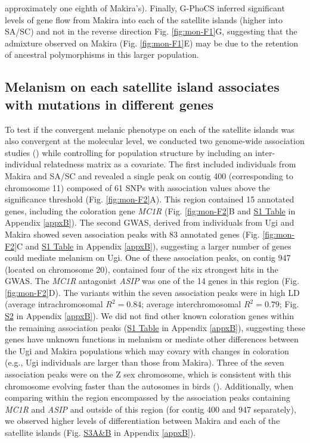 approximately one eighth of Makira’s). Finally, G-PhoCS inferred significant levels of gene flow from Makira into each of the satellite islands (higher into \ac{SA/SC}) and not in the reverse direction Fig. \ref{fig:mon-F1}G, suggesting that the admixture observed on Makira (Fig. \ref{fig:mon-F1}E) may be due to the retention of ancestral polymorphisms in this larger population.

\subsection{Melanism on each satellite island associates with mutations in different genes}
To test if the convergent melanic phenotype on each of the satellite islands was also convergent at the molecular level, we conducted two genome-wide association studies () while controlling for population structure by including an inter-individual relatedness matrix as a covariate. The first included individuals from Makira and \ac{SA/SC} and revealed a single peak on contig 400 (corresponding to chromosome 11) composed of 61 \acsp{SNP} with association values above the significance threshold (Fig. \ref{fig:mon-F2}A). This region contained 15 annotated genes, including the coloration gene \textit{MC1R} (Fig. \ref{fig:mon-F2}B and \href{https://journals.plos.org/PLOSGENETICS/article?id=10.1371/journal.pgen.1010474#sec017}{S1 Table} in Appendix \ref{appxB}). The second \acs{GWAS}, derived from individuals from Ugi and Makira showed seven association peaks with 83 annotated genes (Fig. \ref{fig:mon-F2}C and \href{https://journals.plos.org/PLOSGENETICS/article?id=10.1371/journal.pgen.1010474#sec017}{S1 Table} in Appendix \ref{appxB}), suggesting a larger number of genes could mediate melanism on Ugi. One of these association peaks, on contig 947 (located on chromosome 20), contained four of the six strongest hits in the \acs{GWAS}. The \textit{MC1R} antagonist \textit{ASIP} was one of the 14 genes in this region (Fig. \ref{fig:mon-F2}D). The variants within the seven association peaks were in high \ac{LD} (average intrachromosomal $R^2 = 0.84$; average interchromosomal $R^2 = 0.79$; Fig. \href{https://journals.plos.org/PLOSGENETICS/article?id=10.1371/journal.pgen.1010474#sec017}{S2} in Appendix \ref{appxB}). We did not find other known coloration genes within the remaining association peaks (\href{https://journals.plos.org/PLOSGENETICS/article?id=10.1371/journal.pgen.1010474#sec017}{S1 Table} in Appendix \ref{appxB}), suggesting these genes have unknown functions in melanism or mediate other differences between the Ugi and Makira populations which may covary with changes in coloration (e.g., Ugi individuals are larger than those from Makira). Three of the seven association peaks were on the Z sex chromosome, which is consistent with this chromosome evolving faster than the autosomes in birds (\cite{irwin2018sex}). Additionally, when comparing within the region encompassed by the association peaks containing \textit{MC1R} and \textit{ASIP} and outside of this region (for contig 400 and 947 separately), we observed higher levels of differentiation between Makira and each of the satellite islands (Fig. \href{https://journals.plos.org/PLOSGENETICS/article?id=10.1371/journal.pgen.1010474#sec017}{S3A\&B} in Appendix \ref{appxB}).

